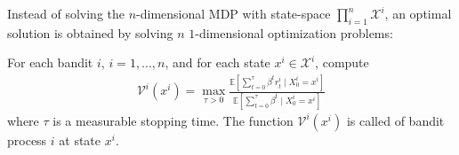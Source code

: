 \documentclass[11pt]{elegantbook}
\begin{document}
Instead of solving the $n$-dimensional MDP with state-space $\prod_{i=1}^n \mathcal{X}^i$, an optimal solution is obtained by solving $n$ $1$-dimensional
optimization problems:
\begin{definition}
    For each bandit $i$,
    $i = 1,..., n$, and for each state $x^i\in \mathcal{X}^i$, compute
    \begin{equation}
        \begin{aligned}
            \mathcal{V}^i(x^i)=\max_{\tau>0}\frac{\mathbb{E}\left[\sum_{t=0}^\tau\beta^tr^i_t\mid X^i_0=x^i\right]}{\mathbb{E}\left[\sum_{t=0}^\tau\beta^t\mid X^i_0=x^i\right]}
        \end{aligned}
        \nonumber
    \end{equation}
    where $\tau$ is a measurable stopping time. The function $\mathcal{V}^i(x^i)$ is called  of bandit process $i$ at state $x^i$.
\end{definition}
\end{document}
